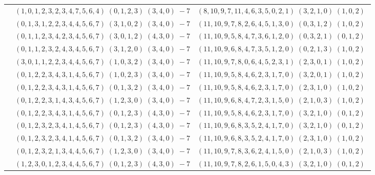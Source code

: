 \documentclass[11pt]{article}
\begin{document}
\begin{longtable}[l]{|c|c|c|}
 \cline{2-3} 
 & $(1 ,0 ,1 ,2 ,3 ,2 ,3 ,4 ,7 ,5 ,6 ,4) \;(0 ,1 ,2 ,3) \;(3 ,4 ,0) \;-7$ & $(8 ,10 ,9 ,7 ,11 ,4 ,6 ,3 ,5 ,0 ,2 ,1) \;(3 ,2 ,1 ,0) \;(1 ,0 ,2) \;$\\ 
 \cline{2-3} 
 & $(0 ,1 ,3 ,1 ,2 ,2 ,3 ,4 ,4 ,5 ,6 ,7) \;(3 ,1 ,0 ,2) \;(3 ,4 ,0) \;-7$ & $(11 ,10 ,9 ,7 ,8 ,2 ,6 ,4 ,5 ,1 ,3 ,0) \;(0 ,3 ,1 ,2) \;(1 ,0 ,2) \;$\\ 
 \cline{2-3} 
 & $(0 ,1 ,1 ,2 ,3 ,4 ,2 ,3 ,4 ,5 ,6 ,7) \;(3 ,0 ,1 ,2) \;(4 ,3 ,0) \;-7$ & $(11 ,10 ,9 ,5 ,8 ,4 ,7 ,3 ,6 ,1 ,2 ,0) \;(0 ,3 ,2 ,1) \;(0 ,1 ,2) \;$\\ 
 \cline{2-3} 
 & $(0 ,1 ,1 ,2 ,3 ,2 ,4 ,3 ,4 ,5 ,6 ,7) \;(3 ,1 ,2 ,0) \;(3 ,4 ,0) \;-7$ & $(11 ,10 ,9 ,6 ,8 ,4 ,7 ,3 ,5 ,1 ,2 ,0) \;(0 ,2 ,1 ,3) \;(1 ,0 ,2) \;$\\ 
 \cline{2-3} 
 & $(3 ,0 ,1 ,1 ,2 ,2 ,3 ,4 ,4 ,5 ,6 ,7) \;(1 ,0 ,3 ,2) \;(3 ,4 ,0) \;-7$ & $(11 ,10 ,9 ,7 ,8 ,0 ,6 ,4 ,5 ,2 ,3 ,1) \;(2 ,3 ,0 ,1) \;(1 ,0 ,2) \;$\\ 
 \cline{2-3} 
 & $(0 ,1 ,2 ,2 ,3 ,4 ,3 ,1 ,4 ,5 ,6 ,7) \;(1 ,0 ,2 ,3) \;(3 ,4 ,0) \;-7$ & $(11 ,10 ,9 ,5 ,8 ,4 ,6 ,2 ,3 ,1 ,7 ,0) \;(3 ,2 ,0 ,1) \;(1 ,0 ,2) \;$\\ 
 \cline{2-3} 
 & $(0 ,1 ,2 ,2 ,3 ,4 ,3 ,1 ,4 ,5 ,6 ,7) \;(0 ,1 ,3 ,2) \;(3 ,4 ,0) \;-7$ & $(11 ,10 ,9 ,5 ,8 ,4 ,6 ,2 ,3 ,1 ,7 ,0) \;(2 ,3 ,1 ,0) \;(1 ,0 ,2) \;$\\ 
 \cline{2-3} 
 & $(0 ,1 ,2 ,2 ,3 ,1 ,4 ,3 ,4 ,5 ,6 ,7) \;(1 ,2 ,3 ,0) \;(3 ,4 ,0) \;-7$ & $(11 ,10 ,9 ,6 ,8 ,4 ,7 ,2 ,3 ,1 ,5 ,0) \;(2 ,1 ,0 ,3) \;(1 ,0 ,2) \;$\\ 
 \cline{2-3} 
 & $(0 ,1 ,2 ,2 ,3 ,4 ,3 ,1 ,4 ,5 ,6 ,7) \;(0 ,1 ,2 ,3) \;(4 ,3 ,0) \;-7$ & $(11 ,10 ,9 ,5 ,8 ,4 ,6 ,2 ,3 ,1 ,7 ,0) \;(3 ,2 ,1 ,0) \;(0 ,1 ,2) \;$\\ 
 \cline{2-3} 
 & $(0 ,1 ,2 ,3 ,2 ,3 ,4 ,1 ,4 ,5 ,6 ,7) \;(0 ,1 ,2 ,3) \;(4 ,3 ,0) \;-7$ & $(11 ,10 ,9 ,6 ,8 ,3 ,5 ,2 ,4 ,1 ,7 ,0) \;(3 ,2 ,1 ,0) \;(0 ,1 ,2) \;$\\ 
 \cline{2-3} 
 & $(0 ,1 ,2 ,3 ,2 ,3 ,4 ,1 ,4 ,5 ,6 ,7) \;(0 ,1 ,3 ,2) \;(3 ,4 ,0) \;-7$ & $(11 ,10 ,9 ,6 ,8 ,3 ,5 ,2 ,4 ,1 ,7 ,0) \;(2 ,3 ,1 ,0) \;(1 ,0 ,2) \;$\\ 
 \cline{2-3} 
 & $(0 ,1 ,2 ,3 ,2 ,1 ,3 ,4 ,4 ,5 ,6 ,7) \;(1 ,2 ,3 ,0) \;(3 ,4 ,0) \;-7$ & $(11 ,10 ,9 ,7 ,8 ,3 ,6 ,2 ,4 ,1 ,5 ,0) \;(2 ,1 ,0 ,3) \;(1 ,0 ,2) \;$\\ 
 \cline{2-3} 
 & $(1 ,2 ,3 ,0 ,1 ,2 ,3 ,4 ,4 ,5 ,6 ,7) \;(0 ,1 ,2 ,3) \;(4 ,3 ,0) \;-7$ & $(11 ,10 ,9 ,7 ,8 ,2 ,6 ,1 ,5 ,0 ,4 ,3) \;(3 ,2 ,1 ,0) \;(0 ,1 ,2) \;$\\ 

\end{longtable}
\end{document}
